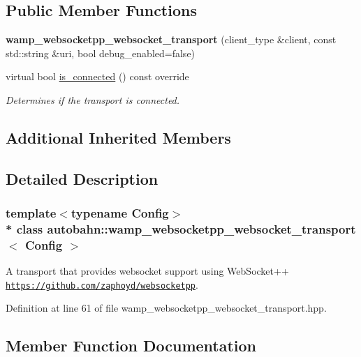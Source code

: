 \subsection*{Public Member Functions}
\begin{DoxyCompactItemize}
\item 
{\bfseries wamp\+\_\+websocketpp\+\_\+websocket\+\_\+transport} (client\+\_\+type \&client, const std\+::string \&uri, bool debug\+\_\+enabled=false)\hypertarget{classautobahn_1_1wamp__websocketpp__websocket__transport_aa26d8bdae2f9ca4cd0fa1a13202825f2}{}\label{classautobahn_1_1wamp__websocketpp__websocket__transport_aa26d8bdae2f9ca4cd0fa1a13202825f2}

\item 
virtual bool \hyperlink{classautobahn_1_1wamp__websocketpp__websocket__transport_a938b8275a75b4f925ba08966f6c8b109}{is\+\_\+connected} () const override
\begin{DoxyCompactList}\small\item\em Determines if the transport is connected. \end{DoxyCompactList}\end{DoxyCompactItemize}
\subsection*{Additional Inherited Members}


\subsection{Detailed Description}
\subsubsection*{template$<$typename Config$>$\\*
class autobahn\+::wamp\+\_\+websocketpp\+\_\+websocket\+\_\+transport$<$ Config $>$}

A transport that provides websocket support using Web\+Socket++ \href{https://github.com/zaphoyd/websocketpp}{\tt https\+://github.\+com/zaphoyd/websocketpp}. 

Definition at line 61 of file wamp\+\_\+websocketpp\+\_\+websocket\+\_\+transport.\+hpp.



\subsection{Member Function Documentation}
